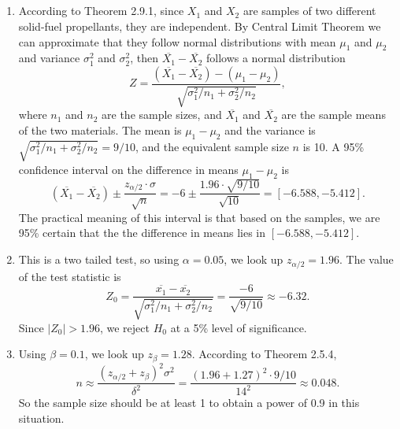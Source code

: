 \documentclass[11pt,a4paper]{article}
\author{Group 37}
\subtitle{Assignment}
\begin{document}
\maketitle

\subsection{}

\subsection{}

\subsection{}

\subsection{}

\begin{enumerate}[label=\roman*)]
\item
According to Theorem 2.9.1, since $X_1$ and $X_2$ are samples of two different solid-fuel propellants, they are independent. By Central Limit Theorem we can approximate that they follow normal distributions with mean $\mu_1$ and $\mu_2$ and variance $\sigma_1^2$ and $\sigma_2^2$, then $\overline{X_1}-\overline{X_2}$ follows a normal distribution
$$Z=\frac{(\overline{X_1}-\overline{X_2})-(\mu_1-\mu_2)}{\sqrt{\sigma_1^2/n_1+\sigma_2^2/n_2}},$$ 
where $n_1$ and $n_2$ are the sample sizes, and $\overline{X_1}$ and $\overline{X_2}$ are the sample means of the two materials. The mean is $\mu_1-\mu_2$ and the variance is $\sqrt{\sigma_1^2/n_1+\sigma_2^2/n_2}=9/10$, and the equivalent sample size $n$ is 10. A 95\% confidence interval on the difference in means $\mu_1-\mu_2$ is
$$(\overline{X_1}-\overline{X_2})\pm\frac{z_{\alpha/2}\cdot \sigma}{\sqrt{n}}=-6\pm\frac{1.96\cdot\sqrt{9/10}}{\sqrt{10}}=[-6.588,-5.412].$$
The practical meaning of this interval is that based on the samples, we are 95\% certain that the the difference in means lies in $[-6.588,-5.412]$.
\item
This is a two tailed test, so using $\alpha=0.05$, we look up $z_{\alpha/2}=1.96$. The value of the test statistic is
$$Z_0=\frac{\overline{x_1}-\overline{x_2}}{\sqrt{\sigma_1^2/n_1+\sigma_2^2/n_2}}=\frac{-6}{\sqrt{9/10}}\approx-6.32.$$
Since $|Z_0|>1.96$, we reject $H_0$ at a 5\% level of significance.
\item
Using $\beta=0.1$, we look up $z_\beta=1.28$. According to Theorem 2.5.4, 
$$n\approx\frac{(z_{\alpha/2}+z_\beta)^2\sigma^2}{\delta^2}=\frac{(1.96+1.27)^2\cdot9/10}{14^2}\approx0.048.$$
So the sample size should be at least 1 to obtain a power of 0.9 in this situation.
\end{enumerate}
\end{document}
